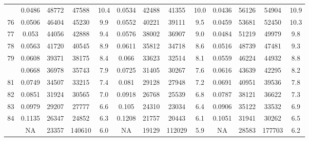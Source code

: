 \documentclass[
  14pt,
]{article}
\begin{document}
\begin{longtable}[t]{lcccccccccccc}
\addlinespace
75 & 0.0486 & 48772 & 47588 & 10.4 & 0.0534 & 42488 & 41355 & 10.0 & 0.0436 & 56126 & 54904 & 10.9\\
76 & 0.0506 & 46404 & 45230 & 9.9 & 0.0552 & 40221 & 39111 & 9.5 & 0.0459 & 53681 & 52450 & 10.3\\
77 & 0.053 & 44056 & 42888 & 9.4 & 0.0576 & 38002 & 36907 & 9.0 & 0.0484 & 51219 & 49979 & 9.8\\
78 & 0.0563 & 41720 & 40545 & 8.9 & 0.0611 & 35812 & 34718 & 8.6 & 0.0516 & 48739 & 47481 & 9.3\\
79 & 0.0608 & 39371 & 38175 & 8.4 & 0.066 & 33623 & 32514 & 8.1 & 0.0559 & 46224 & 44932 & 8.8\\
\addlinespace
80 & 0.0668 & 36978 & 35743 & 7.9 & 0.0725 & 31405 & 30267 & 7.6 & 0.0616 & 43639 & 42295 & 8.2\\
81 & 0.0749 & 34507 & 33215 & 7.4 & 0.081 & 29128 & 27948 & 7.2 & 0.0691 & 40951 & 39536 & 7.8\\
82 & 0.0851 & 31924 & 30565 & 7.0 & 0.0918 & 26768 & 25539 & 6.8 & 0.0787 & 38121 & 36622 & 7.3\\
83 & 0.0979 & 29207 & 27777 & 6.6 & 0.105 & 24310 & 23034 & 6.4 & 0.0906 & 35122 & 33532 & 6.9\\
84 & 0.1135 & 26347 & 24852 & 6.3 & 0.1208 & 21757 & 20443 & 6.1 & 0.1051 & 31941 & 30262 & 6.5\\
\addlinespace
85 & NA & 23357 & 140610 & 6.0 & NA & 19129 & 112029 & 5.9 & NA & 28583 & 177703 & 6.2\\*
\end{longtable}
\end{document}

